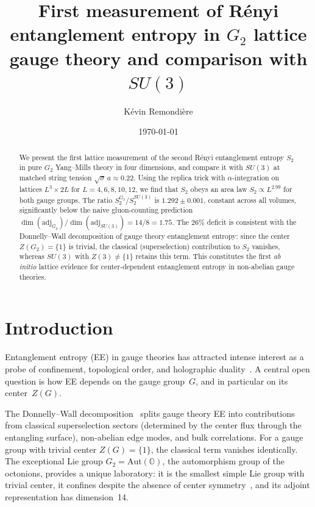 \documentclass[twocolumn,prd,nofootinbib]{revtex4-2}
\begin{document}
\title{First measurement of R\'enyi entanglement entropy in $G_2$ lattice gauge theory and comparison with $SU(3)$}

\author{K\'evin Remondi\`ere}

\date{\today}

\begin{abstract}
We present the first lattice measurement of the second R\'enyi entanglement entropy $S_2$ in pure $G_2$ Yang--Mills theory in four dimensions, and compare it with $SU(3)$ at matched string tension $\sqrt{\sigma}\,a \approx 0.22$. Using the replica trick with $\alpha$-integration on lattices $L^3 \times 2L$ for $L = 4, 6, 8, 10, 12$, we find that $S_2$ obeys an area law $S_2 \propto L^{2.99}$ for both gauge groups. The ratio $S_2^{G_2}/S_2^{SU(3)}$ is $1.292 \pm 0.001$, constant across all volumes, significantly below the naive gluon-counting prediction $\dim(\mathrm{adj}_{G_2})/\dim(\mathrm{adj}_{SU(3)}) = 14/8 = 1.75$. The $26\%$ deficit is consistent with the Donnelly--Wall decomposition of gauge theory entanglement entropy: since the center $Z(G_2) = \{1\}$ is trivial, the classical (superselection) contribution to $S_2$ vanishes, whereas $SU(3)$ with $Z(3) \neq \{1\}$ retains this term. This constitutes the first \emph{ab initio} lattice evidence for center-dependent entanglement entropy in non-abelian gauge theories.
\end{abstract}

\maketitle

\section{Introduction}

Entanglement entropy (EE) in gauge theories has attracted intense interest as a probe of confinement, topological order, and holographic duality~\cite{Donnelly2012,Buividovich2008,Rabenstein2019}. A central open question is how EE depends on the gauge group~$G$, and in particular on its center~$Z(G)$.

The Donnelly--Wall decomposition~\cite{Donnelly2012} splits gauge theory EE into contributions from classical superselection sectors (determined by the center flux through the entangling surface), non-abelian edge modes, and bulk correlations. For a gauge group with trivial center $Z(G) = \{1\}$, the classical term vanishes identically. The exceptional Lie group $G_2 = \mathrm{Aut}(\mathbb{O})$, the automorphism group of the octonions, provides a unique laboratory: it is the smallest simple Lie group with trivial center, it confines despite the absence of center symmetry~\cite{Holland2003,Cossu2007}, and its adjoint representation has dimension~14.
\end{document}
